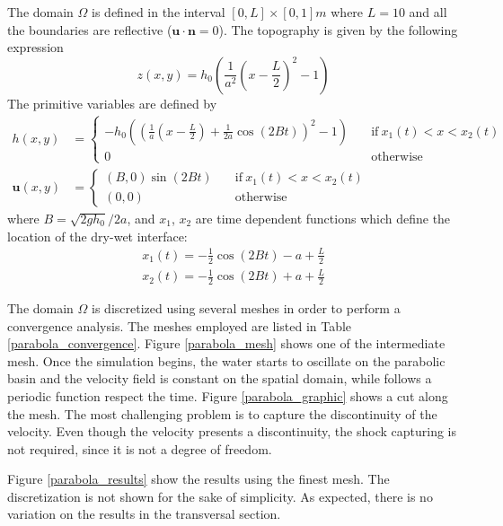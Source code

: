 \documentclass[a4paper,12pt]{elsarticle}
\begin{document}
The domain $\Omega$ is defined in the interval $[0,L]\times[0,1]m$ where $L=10$ and all the boundaries are reflective ($\mathbf{u}\cdot\mathbf{n} = 0$). The topography is given by the following expression
\begin{equation}
z(x,y) = h_0 \left(\frac{1}{a^2}\left(x - \frac{L}{2}\right)^2 - 1\right)
\end{equation}
The primitive variables are defined by
\begin{subequations}
\begin{align}
h(x,y) &=
\begin{cases}
-h_0\left(\left(\frac{1}{a}\left(x - \frac{L}{2}\right) + \frac{1}{2a}\cos(2Bt)\right)^2 - 1\right)
\quad &\text{if} \ x_1(t) < x < x_2(t) \\
0 \quad &\text{otherwise}
\end{cases} \\
\mathbf{u}(x,y) &=
\begin{cases}
(B,0)\sin(2Bt) \quad &\text{if} \ x_1(t) < x < x_2(t) \\
(0,0) \quad &\text{otherwise}
\end{cases}
\end{align}
\end{subequations}
where $B=\sqrt{2gh_0}/2a$, and $x_1$, $x_2$ are time dependent functions which define the location of the dry-wet interface:
\begin{equation}
\begin{split}
x_1(t) = -\frac{1}{2}\cos(2Bt) - a + \frac{L}{2} \\
x_2(t) = -\frac{1}{2}\cos(2Bt) + a + \frac{L}{2}
\end{split}
\end{equation}

The domain $\Omega$ is discretized using several meshes in order to perform a convergence analysis. The meshes employed are listed in Table \ref{parabola_convergence}. Figure \ref{parabola_mesh} shows one of the intermediate mesh. Once the simulation begins, the water starts to oscillate on the parabolic basin and the velocity field is constant on the spatial domain, while follows a periodic function respect the time. Figure \ref{parabola_graphic} shows a cut along the mesh. The most challenging problem is to capture the discontinuity of the velocity. Even though the velocity presents a discontinuity, the shock capturing is not required, since it is not a degree of freedom.

Figure \ref{parabola_results} show the results using the finest mesh. The discretization is not shown for the sake of simplicity. As expected, there is no variation on the results in the transversal section.
\end{document}
